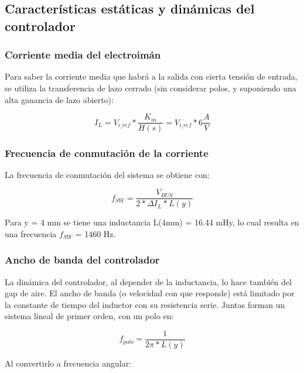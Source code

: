\subsection{Características estáticas y dinámicas del controlador}

\subsubsection{Corriente media del electroimán}

\noindent Para saber la corriente media que habrá a la salida con cierta tensión de entrada, se utiliza la transferencia de lazo cerrado (sin considerar polos, y suponiendo una alta ganancia de lazo abierto):

\begin{equation} 
	I_L = V_{i\_ref} * \frac{K_{in}}{H(s)} = V_{i\_ref} * 6 \frac{A}{V}
\end{equation}

\subsubsection{Frecuencia de conmutación de la corriente}

\noindent La frecuencia de conmutación del sistema se obtiene con:

\begin{equation}\label{eq_frec-sw} 
f_{SW} = \frac{V_{BUS}}{2*\Delta I_L * L(y)}
\end{equation}

\noindent Para y = 4 mm se tiene una inductancia L(4mm) = 16.44 mHy, lo cual resulta en una frecuencia $f_{SW}$ = 1460 Hz.

\subsubsection{Ancho de banda del controlador}

\noindent La dinámica del controlador, al depender de la inductancia, lo hace también del gap de aire. El ancho de banda (o velocidad con que responde) está limitado por la constante de tiempo del inductor con su resistencia serie. Juntas forman un sistema lineal de primer orden, con un polo en:

\begin{equation} 
	f_{polo} = \frac{1}{2\pi * L(y)}
\end{equation}

\noindent Al convertirlo a frecuencia angular:

